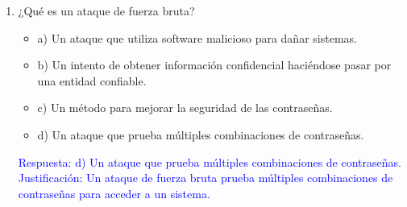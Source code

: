 \documentclass[a4paper]{article}
\begin{document}
\begin{enumerate}
    \item ¿Qué es un ataque de fuerza bruta?
    \begin{itemize}
        \item a) Un ataque que utiliza software malicioso para dañar sistemas.
        \item b) Un intento de obtener información confidencial haciéndose pasar por una entidad confiable.
        \item c) Un método para mejorar la seguridad de las contraseñas.
        \item d) Un ataque que prueba múltiples combinaciones de contraseñas.
    \end{itemize}
    \textcolor{blue}{Respuesta: d) Un ataque que prueba múltiples combinaciones de contraseñas. Justificación: Un ataque de fuerza bruta prueba múltiples combinaciones de contraseñas para acceder a un sistema.}
    \vspace{1cm}


    \vspace{1cm}
    

\end{enumerate}
\end{document}
